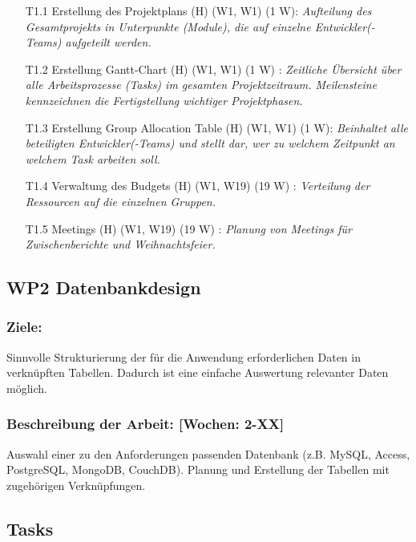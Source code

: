 \documentclass{scrreprt}
\begin{document}
\begin{enumerate}
\item [T1.1] Erstellung des Projektplans (H) (W1, W1) (1 W): \emph{ Aufteilung des Gesamtprojekts in Unterpunkte (Module), die auf einzelne Entwickler(-Teams) aufgeteilt werden.}
\item [T1.2] Erstellung Gantt-Chart (H) (W1, W1) (1 W) : \emph{ Zeitliche Übersicht über alle Arbeitsprozesse (Tasks) im gesamten Projektzeitraum. Meilensteine kennzeichnen die Fertigstellung wichtiger Projektphasen.}
\item [T1.3] Erstellung Group Allocation Table (H) (W1, W1) (1 W): \emph{ Beinhaltet alle beteiligten Entwickler(-Teams) und stellt dar, wer zu welchem Zeitpunkt an welchem Task arbeiten soll.}
\item [T1.4] Verwaltung des Budgets (H) (W1, W19) (19 W) : \emph{Verteilung der Ressourcen auf die einzelnen Gruppen.}
\item [T1.5] Meetings (H) (W1, W19) (19 W) : \emph{Planung von Meetings für Zwischenberichte und Weihnachtsfeier.}
\end{enumerate}

\subsection*{WP2 Datenbankdesign}

\subsubsection{Ziele:} Sinnvolle Strukturierung der für die Anwendung erforderlichen Daten in verknüpften Tabellen. Dadurch ist eine einfache Auswertung relevanter Daten möglich.
\subsubsection{Beschreibung der Arbeit: [Wochen: 2-XX]} Auswahl einer zu den Anforderungen passenden Datenbank (z.B. MySQL, Access, PostgreSQL, MongoDB, CouchDB). Planung und Erstellung der Tabellen mit zugehörigen Verknüpfungen.


\subsection*{Tasks}
\end{document}
